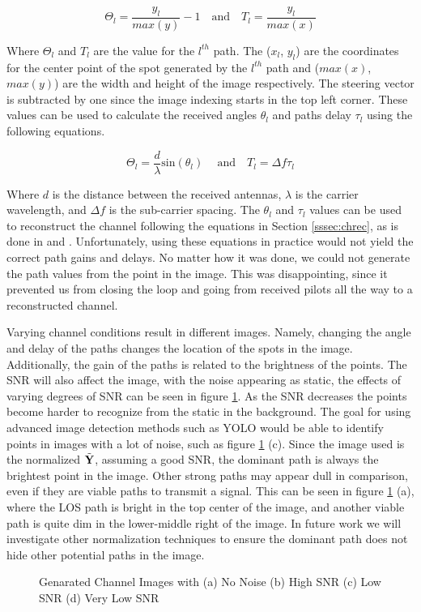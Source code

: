 \[
    \Theta_{l} = \dfrac{y_{l}}{max(y)} - 1 
        \quad\text{and}\quad 
    T_{l} = \dfrac{y_{l}}{max(x)}
\]

\noindent 
Where \(\Theta_{l}\) and \(T_{l}\) are the value for the \(l^{th}\) path. The (\(x_{l}\), \(y_{l}\)) are the coordinates for the center point of the spot generated by the \(l^{th}\) path and (\(max(x)\), \(max(y)\)) are the width and height of the image respectively. The steering vector is subtracted by one since the image indexing starts in the top left corner. These values can be used to calculate the received angles \(\theta_{l}\) and paths delay \(\tau_{l}\) using the following equations.

\[
    \Theta_{l} =  \dfrac{d}{\lambda}\mathrm{sin}(\theta_{l})\
        \quad\text{and}\quad 
    T_{l} = \Delta f \tau_{l}
\]

\noindent
Where \(d\) is the distance between the received antennas, \(\lambda\) is the carrier wavelength, and \(\Delta f\) is the sub-carrier spacing. The \(\theta_{l}\) and $\tau_{l}$ values can be used to reconstruct the channel following the equations in Section \ref{sssec:chrec}, as is done in \cite{Han2019} and \cite{Li2020}. Unfortunately, using these equations in practice would not yield the correct path gains and delays. No matter how it was done, we could not generate the path values from the point in the image. This was disappointing, since it prevented us from closing the loop and going from received pilots all the way to a reconstructed channel.  

Varying channel conditions result in different images. Namely, changing the angle and delay of the paths changes the location of the spots in the image. Additionally, the gain of the paths is related to the brightness of the points. The SNR will also affect the image, with the noise appearing as static, the effects of varying degrees of SNR can be seen in  figure \ref{fig:snrImage}. As the SNR decreases the points become harder to recognize from the static in the background. The goal for using advanced image detection methods such as YOLO would be able to identify points in images with a lot of noise, such as figure \ref{fig:snrImage} (c). Since the image used is the normalized \(\Tilde{\textbf{Y}}\), assuming a good SNR, the dominant path is always the brightest point in the image. Other strong paths may appear dull in comparison, even if they are viable paths to transmit a signal. This can be seen in figure \ref{fig:snrImage} (a), where the LOS path is bright in the top center of the image, and another viable path is quite dim in the lower-middle right of the image. In future work we will investigate other normalization techniques to ensure the dominant path does not hide other potential paths in the image. 

\begin{figure}[H]
    \caption{Genarated Channel Images with (a) No Noise (b) High SNR (c) Low SNR (d) Very Low SNR}
    \label{fig:snrImage}
\end{figure}

